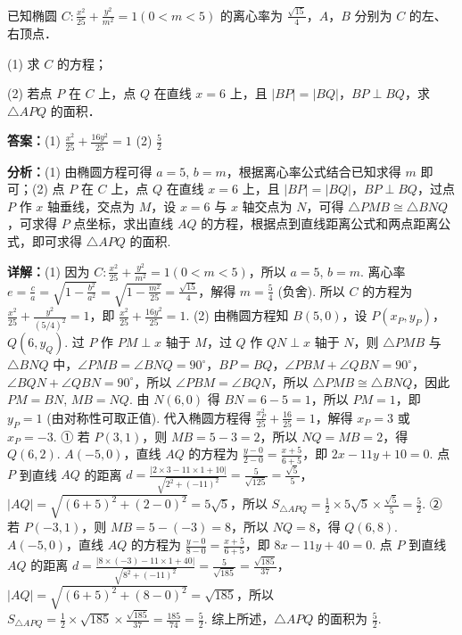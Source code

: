 \begin{question}[points=12]
已知椭圆 $C:\frac{x^2}{25}+\frac{y^2}{m^2}=1(0<m<5)$ 的离心率为 $\frac{\sqrt{15}}{4}$，$A$，$B$ 分别为 $C$ 的左、右顶点．

(1) 求 $C$ 的方程；

(2) 若点 $P$ 在 $C$ 上，点 $Q$ 在直线 $x=6$ 上，且 $|BP|=|BQ|$，$BP\perp BQ$，求 $\triangle APQ$ 的面积．
\begin{solution}
\textbf{答案：}(1) $\frac{x^2}{25}+\frac{16y^2}{25}=1$ (2) $\frac{5}{2}$

\textbf{分析：}(1) 由椭圆方程可得 $a=5$, $b=m$，根据离心率公式结合已知求得 $m$ 即可；(2) 点 $P$ 在 $C$ 上，点 $Q$ 在直线 $x=6$ 上，且 $|BP|=|BQ|$，$BP\perp BQ$，过点 $P$ 作 $x$ 轴垂线，交点为 $M$，设 $x=6$ 与 $x$ 轴交点为 $N$，可得 $\triangle PMB\cong\triangle BNQ$，可求得 $P$ 点坐标，求出直线 $AQ$ 的方程，根据点到直线距离公式和两点距离公式，即可求得 $\triangle APQ$ 的面积.

\textbf{详解：}(1) 因为 $C:\frac{x^2}{25}+\frac{y^2}{m^2}=1(0<m<5)$，所以 $a=5$, $b=m$. 离心率 $e=\frac{c}{a}=\sqrt{1-\frac{b^2}{a^2}}=\sqrt{1-\frac{m^2}{25}}=\frac{\sqrt{15}}{4}$，解得 $m=\frac{5}{4}$ (负舍). 所以 $C$ 的方程为 $\frac{x^2}{25}+\frac{y^2}{(5/4)^2}=1$，即 $\frac{x^2}{25}+\frac{16y^2}{25}=1$.
(2) 由椭圆方程知 $B(5,0)$，设 $P(x_P,y_P)$，$Q(6,y_Q)$. 过 $P$ 作 $PM\perp x$ 轴于 $M$，过 $Q$ 作 $QN\perp x$ 轴于 $N$，则 $\triangle PMB$ 与 $\triangle BNQ$ 中，$\angle PMB=\angle BNQ=90^\circ$，$BP=BQ$，$\angle PBM+\angle QBN=90^\circ$，$\angle BQN+\angle QBN=90^\circ$，所以 $\angle PBM=\angle BQN$，所以 $\triangle PMB\cong\triangle BNQ$，因此 $PM=BN$, $MB=NQ$. 由 $N(6,0)$ 得 $BN=6-5=1$，所以 $PM=1$，即 $y_P=1$ (由对称性可取正值). 代入椭圆方程得 $\frac{x_P^2}{25}+\frac{16}{25}=1$，解得 $x_P=3$ 或 $x_P=-3$.
① 若 $P(3,1)$，则 $MB=5-3=2$，所以 $NQ=MB=2$，得 $Q(6,2)$. $A(-5,0)$，直线 $AQ$ 的方程为 $\frac{y-0}{2-0}=\frac{x+5}{6+5}$，即 $2x-11y+10=0$. 点 $P$ 到直线 $AQ$ 的距离 $d=\frac{|2\times3-11\times1+10|}{\sqrt{2^2+(-11)^2}}=\frac{5}{\sqrt{125}}=\frac{\sqrt{5}}{5}$，$|AQ|=\sqrt{(6+5)^2+(2-0)^2}=5\sqrt{5}$，所以 $S_{\triangle APQ}=\frac{1}{2}\times5\sqrt{5}\times\frac{\sqrt{5}}{5}=\frac{5}{2}$.
② 若 $P(-3,1)$，则 $MB=5-(-3)=8$，所以 $NQ=8$，得 $Q(6,8)$. $A(-5,0)$，直线 $AQ$ 的方程为 $\frac{y-0}{8-0}=\frac{x+5}{6+5}$，即 $8x-11y+40=0$. 点 $P$ 到直线 $AQ$ 的距离 $d=\frac{|8\times(-3)-11\times1+40|}{\sqrt{8^2+(-11)^2}}=\frac{5}{\sqrt{185}}=\frac{\sqrt{185}}{37}$，$|AQ|=\sqrt{(6+5)^2+(8-0)^2}=\sqrt{185}$，所以 $S_{\triangle APQ}=\frac{1}{2}\times\sqrt{185}\times\frac{\sqrt{185}}{37}=\frac{185}{74}=\frac{5}{2}$.
综上所述，$\triangle APQ$ 的面积为 $\frac{5}{2}$.
\end{solution}
\end{question}


